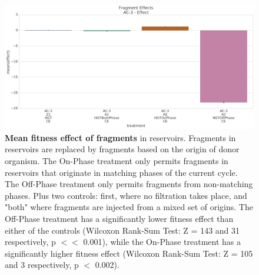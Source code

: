 \documentclass[PhD]{msu-thesis}
\begin{document}
\begin{figure}[h!]
\begin{center}
\includegraphics[width=0.7\columnwidth]{figures/HGT/fitness_effect_by_cycle_phase_source.png}
\caption{\textbf{Mean fitness effect of fragments} in reservoirs. Fragments in reservoirs are replaced by fragments based on the origin of donor organism. The On-Phase treatment only permits fragments in reservoirs that originate in matching phases of the current cycle. The Off-Phase treatment only permits fragments from non-matching phases. Plus two controls: first, where no filtration takes place, and "both" where fragments are injected from a mixed set of origins. The Off-Phase treatment has a significantly lower fitness effect than either of the controls (Wilcoxon Rank-Sum Test: Z = 143 and 31 respectively, p $<<$ 0.001), while the On-Phase treatment has a significantly higher fitness effect (Wilcoxon Rank-Sum Test: Z = 105 and 3 respectively, p $<$ 0.002). 
}\label{fig:fitness_effect_by_cycle_phase_source}
\end{center}
\end{figure}

\end{document}
